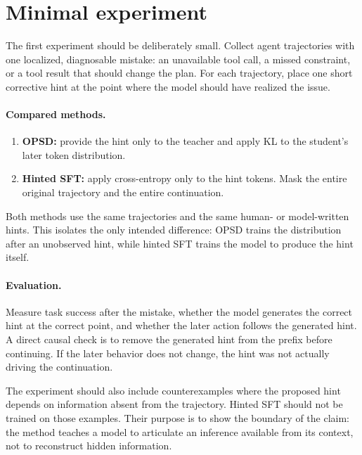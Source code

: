 \section{Minimal experiment}

The first experiment should be deliberately small. Collect agent trajectories with one
localized, diagnosable mistake: an unavailable tool call, a missed constraint, or a tool
result that should change the plan. For each trajectory, place one short corrective hint
at the point where the model should have realized the issue.

\paragraph{Compared methods.}
\begin{enumerate}
  \item \textbf{OPSD:} provide the hint only to the teacher and apply KL to the student's
  later token distribution.
  \item \textbf{Hinted SFT:} apply cross-entropy only to the hint tokens. Mask the entire
  original trajectory and the entire continuation.
\end{enumerate}

Both methods use the same trajectories and the same human- or model-written hints. This
isolates the only intended difference: OPSD trains the distribution after an unobserved
hint, while hinted SFT trains the model to produce the hint itself.

\paragraph{Evaluation.}
Measure task success after the mistake, whether the model generates the correct hint at
the correct point, and whether the later action follows the generated hint. A direct
causal check is to remove the generated hint from the prefix before continuing. If the
later behavior does not change, the hint was not actually driving the continuation.

The experiment should also include counterexamples where the proposed hint depends on
information absent from the trajectory. Hinted SFT should not be trained on those
examples. Their purpose is to show the boundary of the claim: the method teaches a model
to articulate an inference available from its context, not to reconstruct hidden
information.
